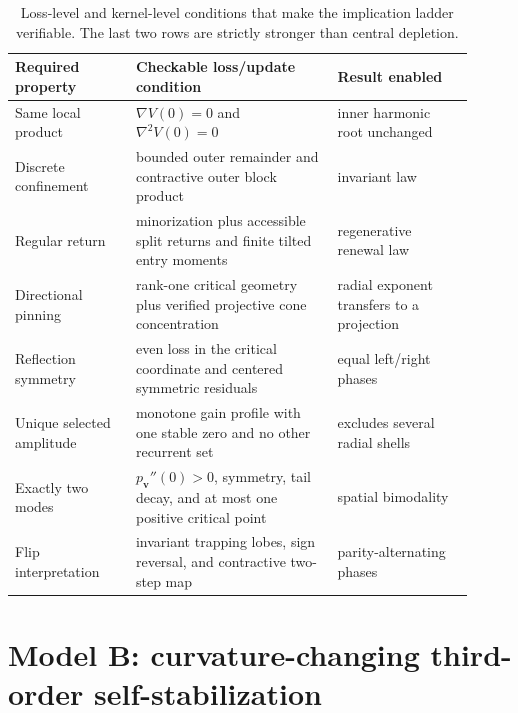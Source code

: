 \documentclass[10pt]{article}
\theoremstyle{definition}
\theoremstyle{remark}
\newcommand{\vvec}{\mathbf v}
\begin{document}
\begin{table}[t]
\centering
\small
\begin{tabular}{p{0.24\linewidth}p{0.40\linewidth}p{0.27\linewidth}}
\toprule
Required property & Checkable loss/update condition & Result enabled \\
\midrule
Same local product & $\nabla V(0)=0$ and $\nabla^2V(0)=0$ & inner harmonic root unchanged \\
Discrete confinement & bounded outer remainder and contractive outer block product & invariant law \\
Regular return & minorization plus accessible split returns and finite tilted entry moments & regenerative renewal law \\
Directional pinning & rank-one critical geometry plus verified projective cone concentration & radial exponent transfers to a projection \\
Reflection symmetry & even loss in the critical coordinate and centered symmetric residuals & equal left/right phases \\
Unique selected amplitude & monotone gain profile with one stable zero and no other recurrent set & excludes several radial shells \\
Exactly two modes & $p_{\vvec}''(0)>0$, symmetry, tail decay, and at most one positive critical point & spatial bimodality \\
Flip interpretation & invariant trapping lobes, sign reversal, and contractive two-step map & parity-alternating phases \\
\bottomrule
\end{tabular}
\caption{Loss-level and kernel-level conditions that make the implication
ladder verifiable.  The last two rows are strictly stronger than central
depletion.}
\label{tab:loss-checklist}
\end{table}

\section{Model B: curvature-changing third-order self-stabilization}
\end{document}
